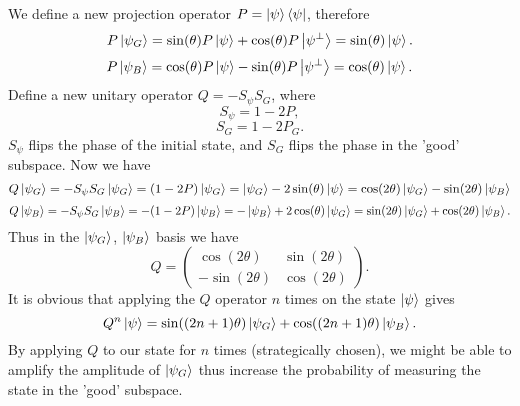 \documentclass{article}
\begin{document}
We define a new projection operator $P = \ket{\psi}\bra{\psi}$, therefore
\begin{equation}
    P\ket{\psi_G} = \sin({\theta})P\ket{\psi} + \cos({\theta})P\ket{\psi ^\bot} = \sin({\theta})\ket{\psi}.
\end{equation}
\begin{equation}
    P\ket{\psi_B} = \cos({\theta})P\ket{\psi} - \sin({\theta})P\ket{\psi ^\bot} = \cos({\theta})\ket{\psi}.
\end{equation}
Define a new unitary operator $Q = -S_\psi S_G$, where
\begin{equation}
    S_\psi = 1 - 2P, \nonumber
\end{equation}
\begin{equation}
    S_G = 1 - 2P_G. \nonumber
\end{equation}
$S_\psi$ flips the phase of the initial state, and $S_G$ flips the phase in the 'good' subspace. Now we have
\begin{equation}
    Q\ket{\psi_G} = -S_\psi S_G \ket{\psi_G} = (1 - 2P) \ket{\psi_G} = \ket{\psi_G} - 2\sin({\theta})\ket{\psi} = \cos({2\theta})\ket{\psi_G} - \sin({2\theta})\ket{\psi_B}
\end{equation}
\begin{equation}
    Q\ket{\psi_B} = -S_\psi S_G \ket{\psi_B} = -(1 - 2P) \ket{\psi_B} = - \ket{\psi_B} + 2\cos({\theta}) \ket{\psi_G} = \sin({2\theta})\ket{\psi_G} + \cos({2\theta})\ket{\psi_B}.
\end{equation}
Thus in the $\ket{\psi_G}$, $\ket{\psi_B}$ basis we have
\begin{equation}
    Q = 
\begin{pmatrix}

\cos({2\theta})&\sin({2\theta})\\
-\sin({2\theta})&\cos({2\theta})
    
\end{pmatrix}.
\end{equation}
It is obvious that applying the $Q$ operator $n$ times on the state $\ket{\psi}$ gives 
\begin{equation}
    Q^n \ket{\psi} = \sin({(2n+1)\theta})\ket{\psi_G} + \cos({(2n+1)\theta})\ket{\psi_B}.
\end{equation}
By applying $Q$ to our state for $n$ times (strategically chosen), we might be able to amplify the amplitude of $\ket{\psi_G}$ thus increase the probability of measuring the state in the 'good' subspace. 
\end{document}
